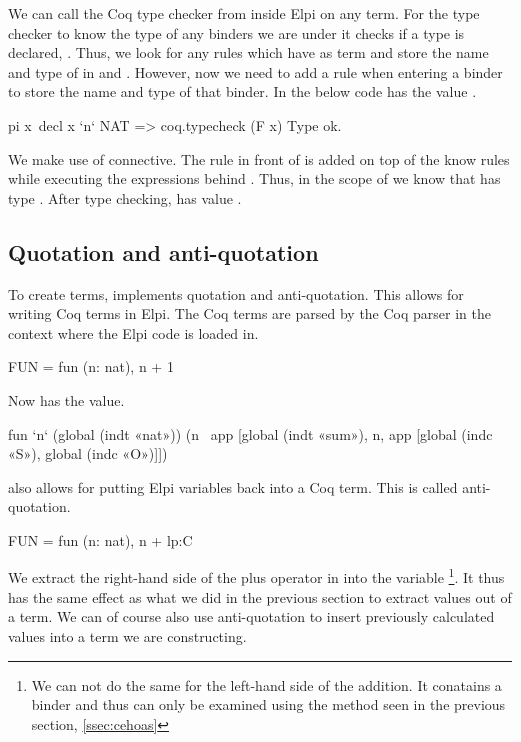 \documentclass[thesis.tex]{subfiles}
\begin{document}
{{{{We can call the Coq type checker from inside Elpi on any term. For the type checker to know the type of any binders we are under it checks if a type is declared, . Thus, we look for any  rules which have as term  and store the name and type of  in  and . However, now we need to add a rule when entering a binder to store the name and type of that binder. In the below code  has the value .
\begin{elpicode}
  pi x\ decl x `n` NAT
          => coq.typecheck (F x) Type ok.
\end{elpicode}
We make use of \elpii{=>} connective. The rule in front of \elpii{=>} is added on top of the know rules while executing the expressions behind \elpii{=>}. Thus, in the scope of  we know that  has type . After type checking,  has value .

\subsection{Quotation and anti-quotation}\label{ssec:ceqoute}
To create terms, \ce implements quotation and anti-quotation. This allows for writing Coq terms in Elpi. The Coq terms are parsed by the Coq parser in the context where the Elpi code is loaded in.
\begin{elpicode}
  FUN = {{ fun (n: nat), n + 1 }}
\end{elpicode}
Now  has the value.
\begin{elpicode}
  fun `n` (global (indt «nat»)) 
            (n \ app [global (indt «sum»), 
                      n, app [global (indc «S»), 
                              global (indc «O»)]])
\end{elpicode}
\ce also allows for putting Elpi variables back into a Coq term. This is called anti-quotation.
\begin{elpicode}
  FUN = {{ fun (n: nat), n + lp:C }}
\end{elpicode}
We extract the right-hand side of the plus operator in  into the variable \footnote{We can not do the same for the left-hand side of the addition. It conatains a binder and thus can only be examined using the method seen in the previous section, \cref{ssec:cehoas}}. It thus has the same effect as what we did in the previous section to extract values out of a term. We can of course also use anti-quotation to insert previously calculated values into a term we are constructing.

}}}}
\end{document}
